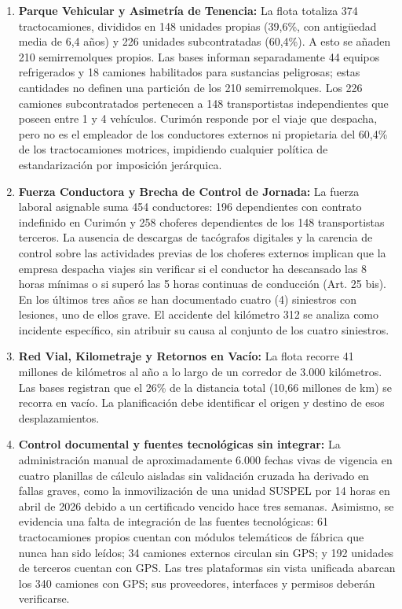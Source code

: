 \begin{enumerate}
  \item \textbf{Parque Vehicular y Asimetría de Tenencia:} La flota totaliza 374 tractocamiones, divididos en 148 unidades propias (39,6\%, con antigüedad media de 6,4 años) y 226 unidades subcontratadas (60,4\%). A esto se añaden 210 semirremolques propios. Las bases informan separadamente 44 equipos refrigerados y 18 camiones habilitados para sustancias peligrosas; estas cantidades no definen una partición de los 210 semirremolques. Los 226 camiones subcontratados pertenecen a 148 transportistas independientes que poseen entre 1 y 4 vehículos. Curimón responde por el viaje que despacha, pero no es el empleador de los conductores externos ni propietaria del 60,4\% de los tractocamiones motrices, impidiendo cualquier política de estandarización por imposición jerárquica.
  \item \textbf{Fuerza Conductora y Brecha de Control de Jornada:} La fuerza laboral asignable suma 454 conductores: 196 dependientes con contrato indefinido en Curimón y 258 choferes dependientes de los 148 transportistas terceros. La ausencia de descargas de tacógrafos digitales y la carencia de control sobre las actividades previas de los choferes externos implican que la empresa despacha viajes sin verificar si el conductor ha descansado las 8 horas mínimas o si superó las 5 horas continuas de conducción (Art. 25 bis). En los últimos tres años se han documentado cuatro (4) siniestros con lesiones, uno de ellos grave. El accidente del kilómetro 312 se analiza como incidente específico, sin atribuir su causa al conjunto de los cuatro siniestros.
  \item \textbf{Red Vial, Kilometraje y Retornos en Vacío:} La flota recorre 41 millones de kilómetros al año a lo largo de un corredor de 3.000 kilómetros. Las bases registran que el 26\% de la distancia total (10,66 millones de km) se recorra en vacío. La planificación debe identificar el origen y destino de esos desplazamientos.
  \item \textbf{Control documental y fuentes tecnológicas sin integrar:} La administración manual de aproximadamente 6.000 fechas vivas de vigencia en cuatro planillas de cálculo aisladas sin validación cruzada ha derivado en fallas graves, como la inmovilización de una unidad SUSPEL por 14 horas en abril de 2026 debido a un certificado vencido hace tres semanas. Asimismo, se evidencia una falta de integración de las fuentes tecnológicas: 61 tractocamiones propios cuentan con módulos telemáticos de fábrica que nunca han sido leídos; 34 camiones externos circulan sin GPS; y 192 unidades de terceros cuentan con GPS. Las tres plataformas sin vista unificada abarcan los 340 camiones con GPS; sus proveedores, interfaces y permisos deberán verificarse.

\end{enumerate}
